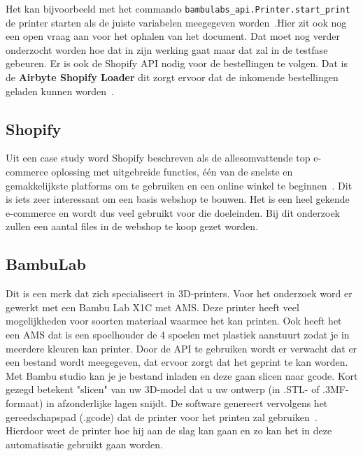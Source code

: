Het kan bijvoorbeeld met het commando \texttt{bambulabs\_api.Printer.start\_print} de printer s\-tarten als  de juiste variabelen meegegeven worden~\autocite{bambulabsAPI}.Hier zit ook nog een open vraag aan voor het ophalen van het document. Dat moet nog verder onderzocht worden hoe dat in zijn werking gaat maar dat zal in de testfase gebeuren.  Er is ook de Shopify API nodig voor de bestellingen te volgen. Dat is de \textbf{Airbyte Shopify Loader} dit zorgt ervoor dat de inkomende bestellingen geladen kunnen worden~\autocite{ilamaIndexShopify}. 



\subsection{Shopify}%

Uit een case study word Shopify beschreven als de allesomvattende top e-commerce oplossing met uitgebreide functies, één van de snelste en gemakkelijkste platforms om te gebruiken en een online winkel te beginnen~\autocite{bang2024}. Dit is iets zeer interessant om een basis webshop te bouwen. Het is een heel gekende e-commerce en wordt dus veel gebruikt voor die doeleinden. Bij dit onderzoek zullen een aantal files in de webshop te koop gezet worden.

\subsection{BambuLab}%

Dit is een merk dat zich specialiseert in 3D-printers. Voor het onderzoek word er gewerkt met een Bambu Lab X1C met AMS. Deze printer heeft veel mogelijkheden voor soorten materiaal waarmee het kan printen. Ook heeft het een AMS dat is een spoelhouder de 4 spoelen met plastiek aanstuurt zodat je in meerdere kleuren kan printer. Door de API te gebruiken wordt er verwacht dat er een bestand wordt meegegeven, dat ervoor zorgt dat het geprint te kan worden. Met Bambu studio kan je je bestand inladen en deze gaan slicen naar gcode. Kort gezegd betekent "slicen" van uw 3D-model dat u uw ontwerp (in .STL- of .3MF-formaat) in afzonderlijke lagen snijdt. De software genereert vervolgens het gereedschapspad (.gcode) dat de printer voor het printen zal gebruiken~\autocite{herrickLibrarySlicing}. Hierdoor weet de printer hoe hij aan de slag kan gaan en zo kan het in deze automatisatie gebruikt gaan worden. 


